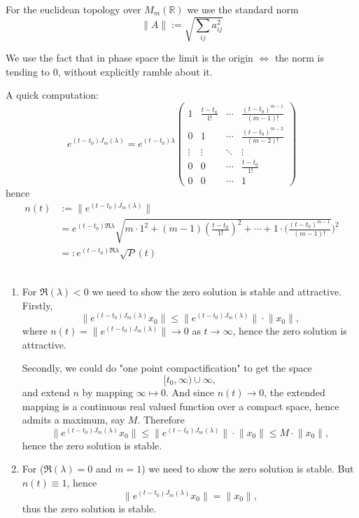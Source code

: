 \documentclass{tufte-handout}
\newcommand\n[1]{\lVert#1\rVert}
\begin{document}
\begin{formalproof} 
For the euclidean topology over $M_m(\mathbb{R})$ we use the standard norm \[ \n{A}:= \sqrt{\sum_{ij} a^2_{ij}} \]

We use the fact that in phase space the limit is the origin $\iff$ the norm is tending to 0, without explicitly ramble about it.

A quick computation: 
\[ e^{(t-t_0)J_m(\lambda)} = e^{(t-t_0)\lambda}
\begin{pmatrix}
	1 & \frac{t-t_0}{1!} & \cdots & \frac{(t-t_0)^{m-1}}{(m-1)!} \\
	0 & 1 & \cdots & \frac{(t-t_0)^{m-2}}{(m-2)!} \\
	\vdots & \vdots & \ddots & \vdots \\ 
	0 & 0 & \cdots & \frac{t-t_0}{1!} \\
	0 & 0 & \cdots & 1
\end{pmatrix}
 \]
 hence 
\begin{align*}
	n(t)&:=\n{e^{(t-t_0)J_m(\lambda)}} \\
	    &= e^{(t-t_0)\Re{\lambda}}\sqrt{m \cdot 1^2+ (m-1)(\frac{t-t_0}{1!})^2 + \cdots + 1 \cdot (\frac{(t-t_0)^{m-1}}{(m-1)!}})^2 \\
	    &=: e^{(t-t_0)\Re{\lambda}} \sqrt{P}(t)
\end{align*}
 \\
\begin{enumerate}[label=\textbf{Case \Roman*:},leftmargin=1.3cm]
	\item For $\Re(\lambda)<0$ we need to show the zero solution is stable and attractive. 
 Firstly, \[ \n{e^{(t-t_0)J_m(\lambda)} x_0} \leq \n{e^{(t-t_0)J_m(\lambda)}} \cdot \n{x_0}, \]
 where $n(t)=\n{e^{(t-t_0)J_m(\lambda)}} \to 0 $ as $t \to \infty$, hence the zero solution is attractive.
 
 Secondly, we could do "one point compactification" to get the space \[ [t_0,\infty)\cup {\infty}, \]
 and extend $n$ by mapping $\infty \mapsto 0$. And since $n(t)\to 0$, the extended mapping is a continuous real valued function over a compact space, hence admits a maximum, say $M$. Therefore 
 \[ \n{e^{(t-t_0)J_m(\lambda)} x_0} \leq \n{e^{(t-t_0)J_m(\lambda)}} \cdot \n{x_0} \leq M \cdot \n{x_0}, \]
 hence the zero solution is stable.
	\item For ($\Re(\lambda)=0$ and $m=1$) we need to show the zero solution is stable. But $n(t)\equiv 1$, hence  \[ \n{e^{(t-t_0)J_m(\lambda)} x_0} =  \n{x_0}, \]
thus the zero solution is stable.


\end{enumerate}
\end{formalproof}
\end{document}
